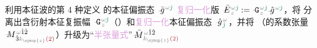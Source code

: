 利用\textcolor{PineGreen}{本征波}的第 4 种定义  的\textcolor{PineGreen}{本征偏振态} $\Xint{{}^{}_{\mathcolor{gray}{-}}}{10}{\bar{g}}^{\;\! \mathcolor{gray}{\omega} \textcolor{PineGreen}{\hat{\jmath}}}$ \textcolor{Plum}{复归一化}版 $\Xint{\mathcolor{gray}{-}}{25}{\bar{E}}^{\;\! \mathcolor{gray}{\omega} \textcolor{PineGreen}{\hat{\jmath}}}_{\;\! \mathcolor{gray}{z}} := \Xint{\mathcolor{gray}{-}}{16}{\mathtt{G}}^{\;\! \mathcolor{gray}{\omega} \textcolor{PineGreen}{\hat{\jmath}}}_{\;\! \mathcolor{gray}{z}} \Xint{{}^{}_{\mathcolor{gray}{-}}}{10}{\hat{g}}^{\;\! \mathcolor{gray}{\omega} \textcolor{PineGreen}{\hat{\jmath}} }$，将  分离出\textcolor{PineGreen}{含衍射本征复振幅} $\Xint{\mathcolor{gray}{-}}{16}{\mathtt{G}}^{\;\!\mathcolor{gray}{\omega} \textcolor{PineGreen}{\hat{\jmath}}}_{\;\! \mathcolor{gray}{z}}$（）和\textcolor{Plum}{复归一化}\textcolor{PineGreen}{本征偏振态} $\Xint{{}^{}_{\mathcolor{gray}{-}}}{10}{\hat{g}}^{\;\!\mathcolor{gray}{\omega}}_{\;\! \textcolor{PineGreen}{\hat{\jmath}}}$，并将 （的系数张量 $\Xint{\mathcolor{gray}{-}}{18}{M}^{\;\! \mathcolor{gray}{\omega} \hat{1} \hat{2} }_{\;\! \hat{3} \mathcolor{gray}{k_{\symup{z}}} \textcolor{Maroon}{(2)} }$）升级为“\textcolor{Plum}{半张量式}”$\Xint{\mathcolor{gray}{-}}{18}{\bar{M}}^{\;\! \mathcolor{gray}{\omega} \hat{1} \hat{2} }_{\;\! \mathcolor{gray}{k_{\symup{z}}} \textcolor{Maroon}{(2)} }$
